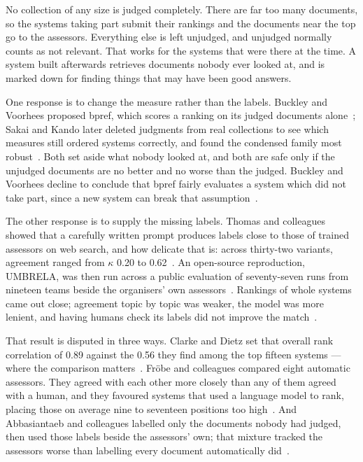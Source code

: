 No collection of any size is judged completely. There are far too many documents, so the
systems taking part submit their rankings and the documents near the top go to the
assessors. Everything else is left unjudged, and unjudged normally counts as not
relevant. That works for the systems that were there at the time. A system built
afterwards retrieves documents nobody ever looked at, and is marked down for finding
things that may have been good answers.

One response is to change the measure rather than the labels. Buckley and Voorhees
proposed bpref, which scores a ranking on its judged documents
alone~\cite{buckley2004incomplete}; Sakai and Kando later deleted judgments from real
collections to see which measures still ordered systems correctly, and found the
condensed family most robust~\cite{sakai2008prime}. Both set aside what nobody looked at,
and both are safe only if the unjudged documents are no better and no worse than the
judged. Buckley and Voorhees decline to conclude that bpref fairly evaluates a system
which did not take part, since a new system can break that
assumption~\cite{buckley2004incomplete}.

The other response is to supply the missing labels. Thomas and colleagues showed that a
carefully written prompt produces labels close to those of trained assessors on web
search, and how delicate that is: across thirty-two variants, agreement ranged from
$\kappa$ 0.20 to 0.62~\cite{thomas2024llm}. An open-source reproduction, UMBRELA, was then run
across a public evaluation of seventy-seven runs from nineteen teams beside the
organisers' own assessors~\cite{upadhyay2025umbrela}. Rankings of
whole systems came out close; agreement topic by topic was weaker, the model was more
lenient, and having humans check its labels did not improve the
match~\cite{upadhyay2025umbrela}.

That result is disputed in three ways. Clarke and Dietz set that overall rank correlation
of 0.89 against the 0.56 they find among the top fifteen systems --- where the
comparison matters~\cite{clarke2024llmassessment}. Fr\"obe and colleagues compared
eight automatic assessors. They agreed with each other more closely than any of them
agreed with a human, and they favoured systems that used a language model to rank,
placing those on average
nine to seventeen positions too high~\cite{froebe2025assessors}. And Abbasiantaeb and
colleagues labelled only the documents nobody had judged, then used those labels beside
the assessors' own; that mixture tracked the assessors worse than labelling every
document automatically did~\cite{abbasiantaeb2024holes}.

